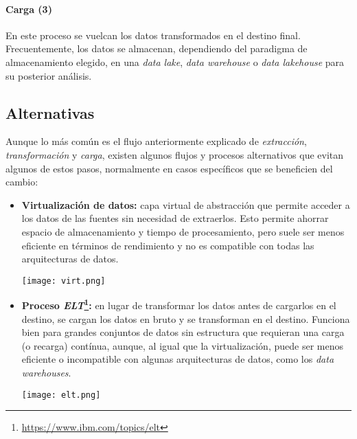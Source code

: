 \paragraph{Carga (3)}
En este proceso se vuelcan los datos transformados en el destino final.
Frecuentemente, los datos se almacenan, dependiendo del paradigma de
almacenamiento elegido, en una \textit{data lake}, \textit{data warehouse} o
\textit{data lakehouse} para su posterior análisis.

\newpage{}
\subsection{Alternativas}
Aunque lo más común es el flujo anteriormente explicado de \textit{extracción},
\textit{transformación} y \textit{carga}, existen algunos flujos y procesos
alternativos que evitan algunos de estos pasos, normalmente en casos específicos
que se beneficien del cambio:

\begin{itemize}
	\item \textbf{Virtualización de datos:} capa virtual de abstracción que
		permite acceder a los datos de las fuentes sin necesidad de extraerlos.
		Esto permite ahorrar espacio de almacenamiento y tiempo de
		procesamiento, pero suele ser menos eficiente en términos de rendimiento
		y no es compatible con todas las arquitecturas de datos.

		\begin{minipage}{\linewidth}
			\centering
			\texttt{[image: virt.png]}
		\end{minipage}
	\item \textbf{Proceso \textit{ELT}\footnote{\url{https://www.ibm.com/topics/elt}}:}
		en lugar de transformar los datos antes de cargarlos en el destino, se
		cargan los datos en bruto y se transforman en el destino. Funciona bien
		para grandes conjuntos de datos sin estructura que requieran una carga
		(o recarga) contínua, aunque, al igual que la virtualización, puede ser
		menos eficiente o incompatible con algunas arquitecturas de datos, como
		los \textit{data warehouses}.

		\begin{minipage}{\linewidth}
			\centering
			\texttt{[image: elt.png]}
		\end{minipage}
\end{itemize}


